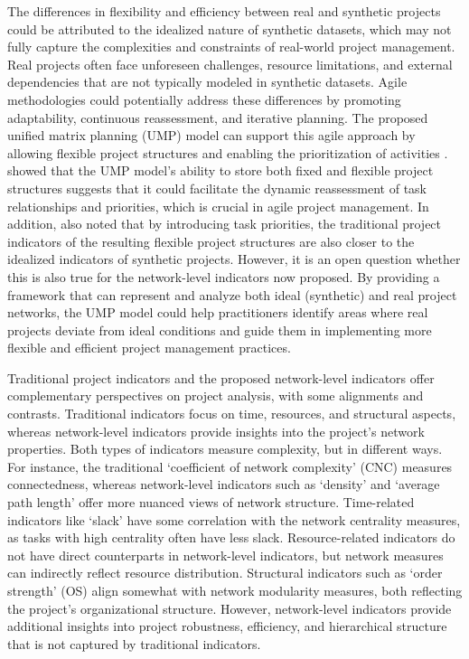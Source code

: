 \documentclass[preprint,
3p]{elsarticle} %
\begin{document}
The differences in flexibility and efficiency between real and synthetic
projects could be attributed to the idealized nature of synthetic
datasets, which may not fully capture the complexities and constraints
of real-world project management. Real projects often face unforeseen
challenges, resource limitations, and external dependencies that are not
typically modeled in synthetic datasets. Agile methodologies could
potentially address these differences by promoting adaptability,
continuous reassessment, and iterative planning. The proposed unified
matrix planning (UMP) model can support this agile approach by allowing
flexible project structures and enabling the prioritization of
activities \citep{kosztyan2023matrix}. \citet{kosztyan2023matrix} showed
that the UMP model's ability to store both fixed and flexible project
structures suggests that it could facilitate the dynamic reassessment of
task relationships and priorities, which is crucial in agile project
management. In addition, \citet{kosztyan2023matrix} also noted that by
introducing task priorities, the traditional project indicators of the
resulting flexible project structures are also closer to the idealized
indicators of synthetic projects. However, it is an open question
whether this is also true for the network-level indicators now proposed.
By providing a framework that can represent and analyze both ideal
(synthetic) and real project networks, the UMP model could help
practitioners identify areas where real projects deviate from ideal
conditions and guide them in implementing more flexible and efficient
project management practices.

Traditional project indicators and the proposed network-level indicators
offer complementary perspectives on project analysis, with some
alignments and contrasts. Traditional indicators focus on time,
resources, and structural aspects, whereas network-level indicators
provide insights into the project's network properties. Both types of
indicators measure complexity, but in different ways. For instance, the
traditional `coefficient of network complexity' (CNC) measures
connectedness, whereas network-level indicators such as `density' and
`average path length' offer more nuanced views of network structure.
Time-related indicators like `slack' have some correlation with the
network centrality measures, as tasks with high centrality often have
less slack. Resource-related indicators do not have direct counterparts
in network-level indicators, but network measures can indirectly reflect
resource distribution. Structural indicators such as `order strength'
(OS) align somewhat with network modularity measures, both reflecting
the project's organizational structure. However, network-level
indicators provide additional insights into project robustness,
efficiency, and hierarchical structure that is not captured by
traditional indicators.
\end{document}
